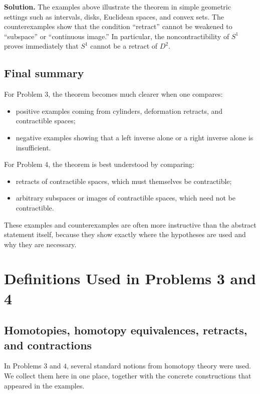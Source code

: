 \documentclass[12pt,a4paper]{article}
\theoremstyle{notespace}
\begin{document}
\bigskip

\textbf{Solution.}
The examples above illustrate the theorem in simple geometric settings such as intervals, disks, Euclidean spaces, and convex sets. The counterexamples show that the condition ``retract'' cannot be weakened to ``subspace'' or ``continuous image.'' In particular, the noncontractibility of \(S^1\) proves immediately that \(S^1\) cannot be a retract of \(D^2\).

\subsection{Final summary}

For Problem 3, the theorem becomes much clearer when one compares:

\begin{itemize}
	\item positive examples coming from cylinders, deformation retracts, and contractible spaces;
	\item negative examples showing that a left inverse alone or a right inverse alone is insufficient.
\end{itemize}

For Problem 4, the theorem is best understood by comparing:

\begin{itemize}
	\item retracts of contractible spaces, which must themselves be contractible;
	\item arbitrary subspaces or images of contractible spaces, which need not be contractible.
\end{itemize}

These examples and counterexamples are often more instructive than the abstract statement itself, because they show exactly where the hypotheses are used and why they are necessary.

\section{Definitions Used in Problems 3 and 4}

\subsection{Homotopies, homotopy equivalences, retracts, and contractions}

In Problems \(3\) and \(4\), several standard notions from homotopy theory were used.  
We collect them here in one place, together with the concrete constructions that appeared in the examples.
\end{document}
